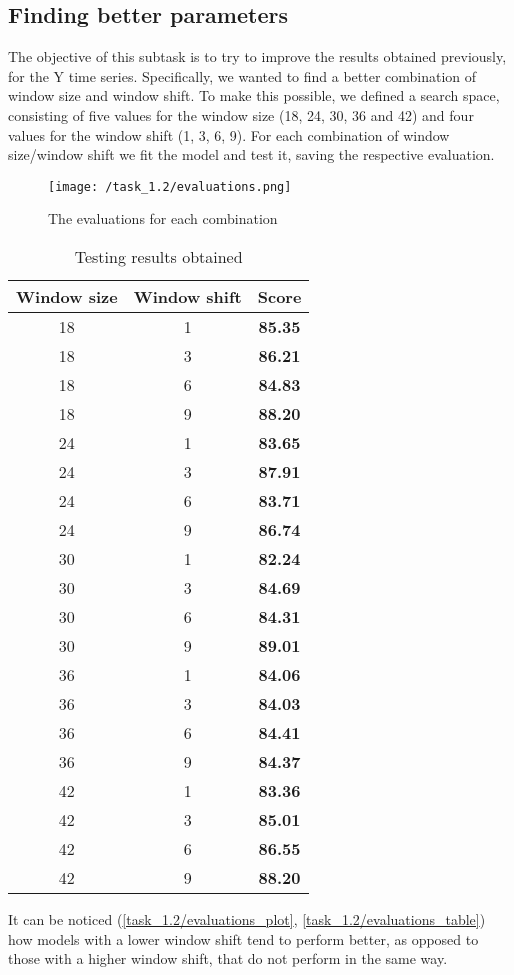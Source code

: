\documentclass[12pt,a4paper,leqno]{article}
\begin{document}
	\subsection{Finding better parameters}
	The objective of this subtask is to try to improve the results obtained previously, for the Y time series. Specifically, we wanted to find a better combination of window size and window shift. To make this possible, we defined a search space, consisting of five values for the window size (18, 24, 30, 36 and 42) and four values for the window shift (1, 3, 6, 9). For each combination of window size/window shift we fit the model and test it, saving the respective evaluation.
	\begin{figure}[h]
		\centering
		\texttt{[image: /task\_1.2/evaluations.png]}
		\caption{The evaluations for each combination}
		\label{task_1.2/evaluations_plot}
	\end{figure}
	\begin{table}
		\centering
		\begin{tabular}{|c|c|c|}
			\hline
			\textbf{Window size} & \textbf{Window shift} & \textbf{Score} \\ 
			\hline
			\hline
			18 & 1 & \textbf{85.35} \\
			18 & 3 & \textbf{86.21} \\
			18 & 6 & \textbf{84.83} \\
			18 & 9 & \textbf{88.20} \\
			24 & 1 & \textbf{83.65} \\
			24 & 3 & \textbf{87.91} \\
			24 & 6 & \textbf{83.71} \\
			24 & 9 & \textbf{86.74} \\
			30 & 1 & \textbf{82.24} \\
			30 & 3 & \textbf{84.69} \\
			30 & 6 & \textbf{84.31} \\
			30 & 9 & \textbf{89.01} \\
			36 & 1 & \textbf{84.06} \\
			36 & 3 & \textbf{84.03} \\
			36 & 6 & \textbf{84.41} \\
			36 & 9 & \textbf{84.37} \\
			42 & 1 & \textbf{83.36} \\
			42 & 3 & \textbf{85.01} \\
			42 & 6 & \textbf{86.55} \\
			42 & 9 & \textbf{88.20} \\
			\hline
		\end{tabular}
		\caption{Testing results obtained}
		\label{task_1.2/evaluations_table}
	\end{table}
	It can be noticed (\autoref{task_1.2/evaluations_plot}, \autoref{task_1.2/evaluations_table}) how models with a lower window shift tend to perform better, as opposed to those with a higher window shift, that do not perform in the same way.
	
\end{document}
